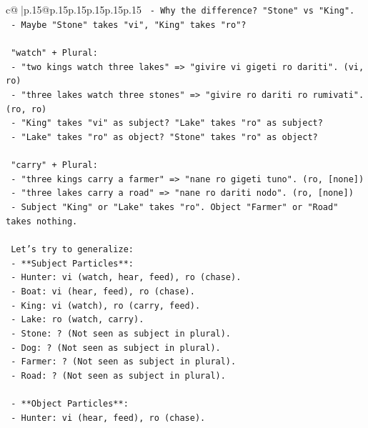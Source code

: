 \documentclass{article}
\begin{document}
{\begin{supertabular}{c@{$\;$}|p{.15\linewidth}@{}p{.15\linewidth}p{.15\linewidth}p{.15\linewidth}p{.15\linewidth}p{.15\linewidth}}
{{{\texttt{    {-} Why the difference? "Stone" vs "King".} \\
\texttt{    {-} Maybe "Stone" takes "vi", "King" takes "ro"?} \\
\\ 
\texttt{    "watch" + Plural:} \\
\texttt{    {-} "two kings watch three lakes" => "givire vi gigeti ro dariti". (vi, ro)} \\
\texttt{    {-} "three lakes watch three stones" => "givire ro dariti ro rumivati". (ro, ro)} \\
\texttt{    {-} "King" takes "vi" as subject? "Lake" takes "ro" as subject?} \\
\texttt{    {-} "Lake" takes "ro" as object? "Stone" takes "ro" as object?} \\
\\ 
\texttt{    "carry" + Plural:} \\
\texttt{    {-} "three kings carry a farmer" => "nane ro gigeti tuno". (ro, {[}none{]})} \\
\texttt{    {-} "three lakes carry a road" => "nane ro dariti nodo". (ro, {[}none{]})} \\
\texttt{    {-} Subject "King" or "Lake" takes "ro". Object "Farmer" or "Road" takes nothing.} \\
\\ 
\texttt{    Let's try to generalize:} \\
\texttt{    {-} **Subject Particles**:} \\
\texttt{        {-} Hunter: vi (watch, hear, feed), ro (chase).} \\
\texttt{        {-} Boat: vi (hear, feed), ro (chase).} \\
\texttt{        {-} King: vi (watch), ro (carry, feed).} \\
\texttt{        {-} Lake: ro (watch, carry).} \\
\texttt{        {-} Stone: ? (Not seen as subject in plural).} \\
\texttt{        {-} Dog: ? (Not seen as subject in plural).} \\
\texttt{        {-} Farmer: ? (Not seen as subject in plural).} \\
\texttt{        {-} Road: ? (Not seen as subject in plural).} \\
\\ 
\texttt{    {-} **Object Particles**:} \\
\texttt{        {-} Hunter: vi (hear, feed), ro (chase).} \\
}}}
\end{supertabular}}
\end{document}

